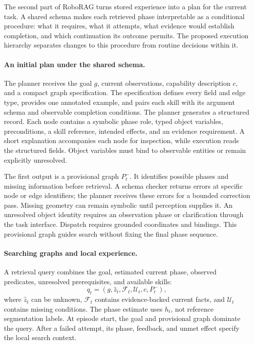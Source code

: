 \documentclass[10pt,twocolumn,letterpaper]{article}
\begin{document}
The second part of RoboRAG turns stored experience into a plan for the current task. A shared schema makes each retrieved phase interpretable as a conditional procedure: what it requires, what it attempts, what evidence would establish completion, and which continuation its outcome permits. The proposed execution hierarchy separates changes to this procedure from routine decisions within it.

\paragraph{An initial plan under the shared schema.}
The planner receives the goal $g$, current observations, capability description $c$, and a compact graph specification. The specification defines every field and edge type, provides one annotated example, and pairs each skill with its argument schema and observable completion conditions. The planner generates a structured record. Each node contains a symbolic phase role, typed object variables, preconditions, a skill reference, intended effects, and an evidence requirement. A short explanation accompanies each node for inspection, while execution reads the structured fields. Object variables must bind to observable entities or remain explicitly unresolved.

The first output is a provisional graph $P_t^{-}$. It identifies possible phases and missing information before retrieval. A schema checker returns errors at specific node or edge identifiers; the planner receives these errors for a bounded correction pass. Missing geometry can remain symbolic until perception supplies it. An unresolved object identity requires an observation phase or clarification through the task interface. Dispatch requires grounded coordinates and bindings. This provisional graph guides search without fixing the final phase sequence.

\paragraph{Searching graphs and local experience.}
A retrieval query combines the goal, estimated current phase, observed predicates, unresolved prerequisites, and available skills:
\begin{equation}
q_t=(g,\hat z_t,\mathcal F_t,\mathcal U_t,c,P_t^{-}),
\label{eq:graph-query}
\end{equation}
where $\hat z_t$ can be unknown, $\mathcal F_t$ contains evidence-backed current facts, and $\mathcal U_t$ contains missing conditions. The phase estimate uses $h_t$, not reference segmentation labels. At episode start, the goal and provisional graph dominate the query. After a failed attempt, its phase, feedback, and unmet effect specify the local search context.
\end{document}
